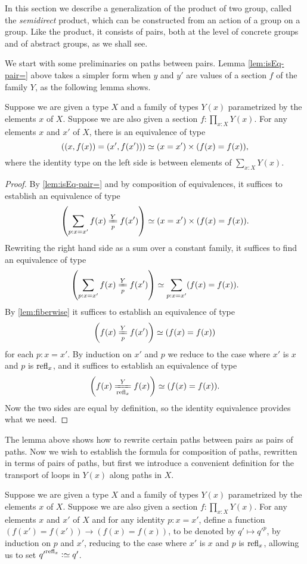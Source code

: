 In this section we describe a generalization of the product of two group, called the {\em semidirect} product, which can be constructed from an
action of a group on a group.  Like the product, it consists of pairs, both at the level of concrete groups and of abstract groups, as we shall
see.

We start with some preliminaries on paths between pairs. 
Lemma \cref{lem:isEq-pair=} above takes a simpler form when $y$ and $y'$ are values of a section $f$ of the family $Y$, as the following lemma shows.

\begin{lemma}\label{lem:pathpairsection}
  Suppose we are given a type $X$ and a family of types $Y(x)$ parametrized by the elements $x$ of $X$.
  Suppose we are also given a section $f : \prod_{x:X} Y(x)$.
  For any elements $x$ and $x'$ of $X$,
  there is an equivalence of type
  $$\left ( (x,f(x)) = (x',f(x')) \right ) \simeq (x=x') \times (f(x) = f(x)),$$
  where the identity type on the left side is between elements of $\sum_{x:X} Y(x)$.
\end{lemma}

\begin{proof}
  By \cref{lem:isEq-pair=} and by composition of equivalences, it suffices to establish an equivalence of type
  $$\left( \sum_{p:x=x'} \pathover {f(x)} Y p {f(x')} \right) \weq (x=x') \times (f(x) = f(x)).$$
  Rewriting the right hand side as a sum over a constant family, it suffices to find an equivalence of type
  $$\left( \sum_{p:x=x'} \pathover {f(x)} Y p {f(x')} \right) \weq \sum_{p:x=x'} (f(x) = f(x)).$$
  By \cref{lem:fiberwise} it suffices to establish an equivalence of type 
  $$ \left( \pathover {f(x)} Y p {f(x')} \right) \weq (f(x) = f(x))$$
  for each $p:x=x'$.  By induction on $x'$ and $p$ we reduce to the case where $x'$ is $x$ and $p$ is $\refl x$, and it suffices to establish an
  equivalence of type 
  $$ \left( \pathover {f(x)} Y {\refl x} {f(x)} \right) \weq (f(x) = f(x)).$$
  Now the two sides are equal by definition, so the identity equivalence provides what we need.  
\end{proof}

The lemma above shows how to rewrite certain paths between pairs as pairs of paths.  Now we wish to establish the formula for composition of
paths, rewritten in terms of pairs of paths, but first we introduce a convenient definition for the transport of loops in $Y(x)$ along paths in
$X$.

\begin{definition}\label{def:pathsectionaction}
  Suppose we are given a type $X$ and a family of types $Y(x)$ parametrized by the elements $x$ of $X$.
  Suppose we are also given a section $f : \prod_{x:X} Y(x)$.
  For any elements $x$ and $x'$ of $X$ and for any identity $p : x = x'$, define a function $(f(x') = f(x')) \to (f(x) = f(x))$, to be denoted
  by $q' \mapsto {q'} ^ p$, by induction on $p$ and $x'$, reducing to the case where $x'$ is $x$ and $p$ is $\refl x$, allowing us to
  set ${q'} ^{ \refl x } \defeq q'$.
\end{definition}  

